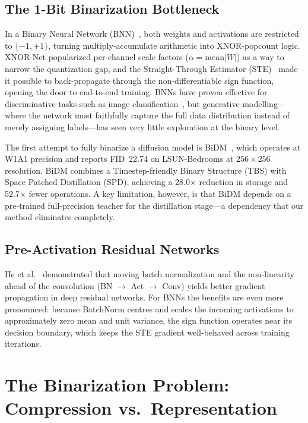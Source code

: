 \documentclass[conference]{IEEEtran}
\begin{document}
\subsection{The 1-Bit Binarization Bottleneck}

In a Binary Neural Network
(BNN)~\cite{hubara2016bnn,rastegari2016xnornet}, both weights and activations are
restricted to $\{-1,+1\}$, turning multiply-accumulate arithmetic into XNOR-popcount
logic. XNOR-Net popularized per-channel scale factors
($\alpha = \text{mean}|W|$) as a way to narrow the quantization gap, and the
Straight-Through Estimator (STE)~\cite{bengio2013ste} made it possible to back-propagate
through the non-differentiable sign function, opening the door to end-to-end training.
BNNs have proven effective for discriminative tasks such as image
classification~\cite{liu2020reactnet,martinez2020training}, but generative
modelling---where the network must faithfully capture the full data distribution instead
of merely assigning labels---has seen very little exploration at the binary level.

The first attempt to fully binarize a diffusion model is
BiDM~\cite{bidm2024}, which operates at W1A1 precision and reports FID~22.74 on
LSUN-Bedrooms at $256{\times}256$ resolution. BiDM combines a Timestep-friendly Binary
Structure (TBS) with Space Patched Distillation (SPD), achieving a 28.0$\times$
reduction in storage and 52.7$\times$ fewer operations. A key limitation, however, is
that BiDM depends on a pre-trained full-precision teacher for the distillation
stage---a dependency that our method eliminates completely.

\subsection{Pre-Activation Residual Networks}

He et al.~\cite{he2016preact} demonstrated that moving batch normalization and the
non-linearity ahead of the convolution (BN $\to$ Act $\to$ Conv) yields better gradient
propagation in deep residual networks. For BNNs the benefits are even more pronounced:
because BatchNorm centres and scales the incoming activations to approximately zero mean
and unit variance, the sign function operates near its decision boundary, which keeps
the STE gradient well-behaved across training iterations.

\section{The Binarization Problem: Compression vs.\ Representation}
\end{document}
